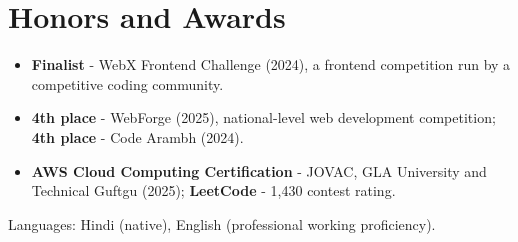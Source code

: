 \documentclass[11pt,a4paper,sans]{moderncv}
\begin{document}

\section{Honors and Awards}
\vspace{1pt}
\begin{itemize}
    \item {\textbf{Finalist} - WebX Frontend Challenge (2024), a frontend competition run by a competitive coding community.}
    \item {\textbf{4th place} - WebForge (2025), national-level web development competition; \textbf{4th place} - Code Arambh (2024).}
    \item {\textbf{AWS Cloud Computing Certification} - JOVAC, GLA University and Technical Guftgu (2025); \textbf{LeetCode} - 1,430 contest rating.}
\end{itemize}


\vspace{2pt}
\small{Languages: Hindi (native), English (professional working proficiency).}
\end{document}
